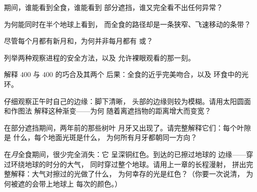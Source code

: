 \begin{exercise}[$\star$]\label{exo:g7:shadows-eclipses:5}
期间，谁能看到全食，谁能看到
部分遮挡，谁又完全看不出任何异常？
\end{exercise}

\begin{exercise}[$\star$]\label{exo:g7:shadows-eclipses:6}
为何能同时在半个地球上看到，
而全食的路径却是一条狭窄、飞速移动的条带？
\end{exercise}

\begin{exercise}[$\star$]\label{exo:g7:shadows-eclipses:7}
尽管每个月都有新月和，为何并非每月都有
或？
\end{exercise}

\begin{exercise}[$\star$]\label{exo:g7:shadows-eclipses:8}
列举两种观察进程的安全方法，以及
允许裸眼观看的那一刻。
\end{exercise}

\begin{exercise}[$\star\star$]\label{exo:g7:shadows-eclipses:9}
解释 $400$ 与 $400$ 的巧合及其两个
后果：全食的近乎完美吻合，以及
环食中的光环。
\end{exercise}

\begin{exercise}[$\star\star$]\label{exo:g7:shadows-eclipses:10}
仔细观察正午时自己的边缘：脚下清晰，
头部的边缘则较为模糊。请用太阳圆面和作图法
解释这种渐变——为何
随着离遮挡物的距离增大而变宽？
\end{exercise}

\begin{exercise}[$\star\star$]\label{exo:g7:shadows-eclipses:11}
在部分遮挡期间，两年前的那些树叶
月牙又出现了。请完整解释它们：每个叶隙是
什么，每个地面光斑是什么，
为何所有月牙都朝同一方向？
\end{exercise}

\begin{exercise}[$\star\star\star$]\label{exo:g7:shadows-eclipses:12}
在\emph{月}全食期间，很少完全消失：它
呈深铜红色。到达的已擦过地球的
边缘——穿过环绕地球的时分的大气，
同时穿过整个地球。请用上一章的长程漫射，
拼出完整解释：大气对擦过的光做了什么，
为何幸存的光是红色？（你要一次说清，
为何被遮的会带上地球上
每次的颜色。）
\end{exercise}

